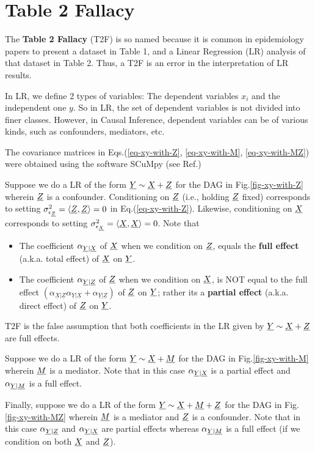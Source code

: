 \chapter{Table 2 Fallacy}
\label{ch-table-2-fallacy}
The {\bf Table 2 Fallacy} (T2F) is so named
because it is common in epidemiology papers
to present a dataset in Table 1, 
and a Linear Regression (LR) analysis of that dataset in Table 2.
Thus, a T2F is an error in the interpretation of LR results.

In LR, we define 2 types of variables:
The dependent variables $x_i$
and the  independent one $y$. So
in LR, the set of dependent variables is  
not divided into finer classes. However, in Causal Inference,
dependent variables can be of various kinds, such as confounders, mediators, etc.

The covariance matrices in Eqs.(\ref{eq-xy-with-Z}, \ref{eq-xy-with-M}, \ref{eq-xy-with-MZ}) were obtained
using the software SCuMpy (see Ref.\cite{scumpy})

Suppose we do a LR of the form ${\underline{Y}} \sim {\underline{X}} + {\underline{Z}}$
for the DAG in Fig.\ref{fig-xy-with-Z}
wherein ${\underline{Z}}$ is a confounder.
Conditioning on ${\underline{Z}}$
(i.e., holding ${\underline{Z}}$ fixed) corresponds to
setting $\sigma^2_{\epsilon_{\underline{Z}}}=\left\langle{\underline{Z}}, {\underline{Z}}\right\rangle=0$ in Eq.(\ref{eq-xy-with-Z}).
Likewise, conditioning on ${\underline{X}}$ corresponds to
setting $\sigma^2_{\epsilon_{\underline{X}}}=\left\langle{\underline{X}}, {\underline{X}}\right\rangle=0$.
Note that
\begin{itemize}
\item
The coefficient  $\alpha_{{\underline{Y}}|{\underline{X}}}$ of ${\underline{X}}$ when we condition on ${\underline{Z}}$, equals the {\bf full effect} (a.k.a. {total effect})
of ${\underline{X}}$ on ${\underline{Y}}$.
\item
The coefficient $\alpha_{{\underline{Y}}|{\underline{Z}}}$ of ${\underline{Z}}$ when we condition on ${\underline{X}}$,
is NOT equal to the full effect 
$\left(\alpha_{\underline{X}|\underline{Z}} \alpha_{\underline{Y}|\underline{X}} + \alpha_{\underline{Y}|\underline{Z}}\right)$ of ${\underline{Z}}$ on ${\underline{Y}}$;  rather its a {\bf partial effect} (a.k.a. {direct effect})
of ${\underline{Z}}$ on ${\underline{Y}}$.
\end{itemize}
T2F is the false assumption that both
coefficients in the LR given by ${\underline{Y}}\sim {\underline{X}} +{\underline{Z}}$
are full effects.

Suppose we do a LR of the form ${\underline{Y}} \sim {\underline{X}} + {\underline{M}}$
for the DAG in Fig.\ref{fig-xy-with-M}
wherein ${\underline{M}}$ is a mediator.
Note that in this case $\alpha_{{\underline{Y}}|{\underline{X}}}$
is a partial effect and $\alpha_{{\underline{Y}}|{\underline{M}}}$ is a full effect.

Finally, suppose we do a LR of the form ${\underline{Y}} \sim {\underline{X}} + {\underline{M}} +{\underline{Z}}$
for the DAG in Fig.\ref{fig-xy-with-MZ}
wherein ${\underline{M}}$ is a mediator and ${\underline{Z}}$ is a confounder.
Note that in this case $\alpha_{{\underline{Y}}|{\underline{Z}}}$ and
$\alpha_{{\underline{Y}}|{\underline{X}}}$ are partial effects whereas $\alpha_{{\underline{Y}}|{\underline{M}}}$ is a full effect (if we condition on both ${\underline{X}}$ and ${\underline{Z}}$).

